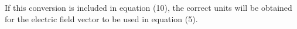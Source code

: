 \documentclass[10pt]{article}
\begin{document}



If this conversion is included in equation (10), the correct units will be obtained for the electric field vector to be used in equation (5).
\\







\end{document}
